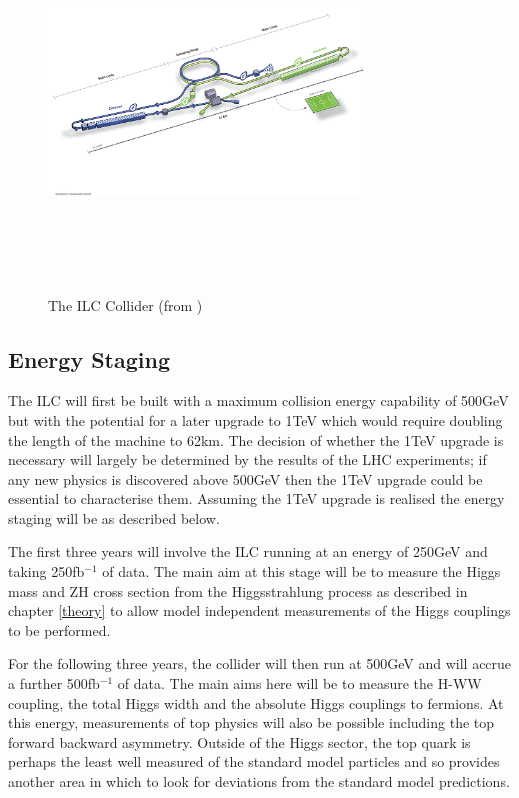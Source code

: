 \begin{figure}
  \centering
  \includegraphics[width=0.75\textwidth,height=10cm,keepaspectratio]{Experiments/fig/ILC}
  \caption[The ILC Experiment]{The \ac{ILC} Collider (from \cite{ILCTDR})}
  \label{Fig:ILC}
\end{figure}

\subsection{Energy Staging}

The \ac{ILC} will first be built with a maximum collision energy capability of 500GeV but with the potential for a later upgrade to 1TeV which would require doubling the length of the machine to 62km. The decision of whether the 1TeV upgrade is necessary will largely be determined by the results of the \ac{LHC} experiments; if any new physics is discovered above 500GeV then the 1TeV upgrade could be essential to characterise them. Assuming the 1TeV upgrade is realised the energy staging will be as described below.

The first three years will involve the ILC running at an energy of 250GeV and taking 250fb${^{-1}}$ of data. The main aim at this stage will be to measure the Higgs mass and ZH cross section from the Higgsstrahlung process as described in chapter \ref{theory} to allow model independent measurements of the Higgs couplings to be performed.

For the following three years, the collider will then run at 500GeV and will accrue a further 500fb${^{-1}}$ of data. The main aims here will be to measure the H-WW coupling, the total Higgs width and the absolute Higgs couplings to fermions. At this energy, measurements of top physics will also be possible including the top forward backward asymmetry. Outside of the Higgs sector, the top quark is perhaps the least well measured of the standard model particles and so provides another area in which to look for deviations from the standard model predictions.

